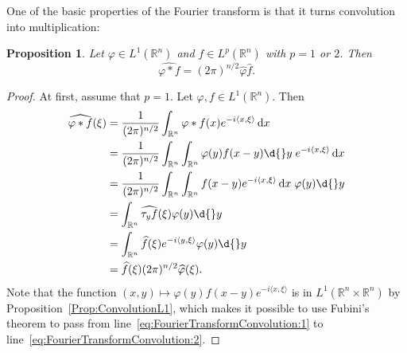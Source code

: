 \documentclass[12pt, oneside, a4paper]{article}
\newtheorem{prop}[thm]{Proposition}
\theoremstyle{dfn}
\newcommand{\scalprod}[2]{\langle #1,#2 \rangle}
\def\Rbb{\ensuremath{\mathbb{R}}}
\def\dx{\,\mathrm dx}
\begin{document}
One of the basic properties of the Fourier transform is that it turns convolution into multiplication:

\begin{prop}
Let $\varphi \in L^1(\Rbb^n)$ and $f \in L^p(\Rbb^n)$ with $p=1$ or $2$. Then
\[
\widehat{\varphi * f} = (2\pi)^{n/2} \widehat{\varphi} \widehat{f}.
\]
\end{prop}

\begin{proof}
At first, assume that $p = 1$. Let $\varphi, f \in L^1(\Rbb^n)$. Then
\begin{align}
	\widehat{\varphi * f}(\xi)
	&= \frac{1}{(2\pi)^{n/2}} \int_{\Rbb^n} \varphi * f(x) e^{-i\scalprod{x}{\xi}} \dx \nonumber \\
	&= \frac{1}{(2\pi)^{n/2}} \int_{\Rbb^n} \int_{\Rbb^n} \varphi(y) f(x-y) \d{}y \; e^{-i\scalprod{x}{\xi}} \dx \label{eq:FourierTransformConvolution:1} \\
	&= \frac{1}{(2\pi)^{n/2}} \int_{\Rbb^n} \int_{\Rbb^n} f(x-y) e^{-i\scalprod{x}{\xi}} \dx \; \varphi(y) \d{}y \label{eq:FourierTransformConvolution:2} \\
	&= \int_{\Rbb^n} \widehat{\tau_y f}(\xi) \varphi(y) \d{}y \nonumber \\
	&= \int_{\Rbb^n} \widehat{f}(\xi) e^{-i\scalprod{y}{\xi}} \varphi(y) \d{}y \nonumber \\
	&= \widehat{f}(\xi) (2\pi)^{n/2} \widehat{\varphi}(\xi). \nonumber
\end{align}
Note that the function $(x,y) \mapsto \varphi(y) f(x-y) e^{-i\scalprod{x}{\xi}}$ is in $L^1(\Rbb^n \times \Rbb^n)$ by Proposition~\ref{Prop:ConvolutionL1}, which makes it possible to use Fubini's theorem to pass from line~\eqref{eq:FourierTransformConvolution:1} to line~\eqref{eq:FourierTransformConvolution:2}.


\end{proof}
\end{document}
